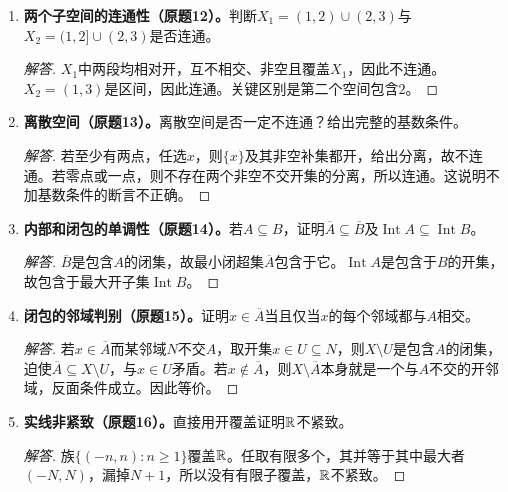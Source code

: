\begin{enumerate}[label=\textbf{1.\arabic*.},ref=1.\arabic*,leftmargin=*]
\begin{proof}[解答]
取$h(t)=\tan\bigl(\pi(t-a)/(b-a)-\pi/2\bigr)$。括号将$(a,b)$线性双射到$(-\pi/2,\pi/2)$，正切在该区间连续、严格递增，且在两端趋于$\mp\infty$，故$h$连续双射。逆映射为$h^{-1}(s)=a+(b-a)(\arctan s+\pi/2)/\pi$，也连续，故为同胚。
\end{proof}
\item \textbf{两个子空间的连通性（原题12）。}判断$X_1=(1,2)\cup(2,3)$与$X_2=(1,2]\cup(2,3)$是否连通。
\begin{proof}[解答]
$X_1$中两段均相对开，互不相交、非空且覆盖$X_1$，因此不连通。$X_2=(1,3)$是区间，因此连通。关键区别是第二个空间包含$2$。
\end{proof}
\item \textbf{离散空间（原题13）。}离散空间是否一定不连通？给出完整的基数条件。
\begin{proof}[解答]
若至少有两点，任选$x$，则$\{x\}$及其非空补集都开，给出分离，故不连通。若零点或一点，则不存在两个非空不交开集的分离，所以连通。这说明不加基数条件的断言不正确。
\end{proof}
\item \textbf{内部和闭包的单调性（原题14）。}若$A\subseteq B$，证明$\overline A\subseteq\overline B$及$\operatorname{Int}A\subseteq\operatorname{Int}B$。
\begin{proof}[解答]
$\overline B$是包含$A$的闭集，故最小闭超集$\overline A$包含于它。$\operatorname{Int}A$是包含于$B$的开集，故包含于最大开子集$\operatorname{Int}B$。
\end{proof}
\item \textbf{闭包的邻域判别（原题15）。}证明$x\in\overline A$当且仅当$x$的每个邻域都与$A$相交。
\begin{proof}[解答]
若$x\in\overline A$而某邻域$N$不交$A$，取开集$x\in U\subseteq N$，则$X\setminus U$是包含$A$的闭集，迫使$\overline A\subseteq X\setminus U$，与$x\in U$矛盾。若$x\notin\overline A$，则$X\setminus\overline A$本身就是一个与$A$不交的开邻域，反面条件成立。因此等价。
\end{proof}
\item \textbf{实线非紧致（原题16）。}直接用开覆盖证明$\mathbb{R}$不紧致。
\begin{proof}[解答]
族$\{(-n,n):n\geq1\}$覆盖$\mathbb{R}$。任取有限多个，其并等于其中最大者$(-N,N)$，漏掉$N+1$，所以没有有限子覆盖，$\mathbb{R}$不紧致。
\end{proof}
\end{enumerate}
